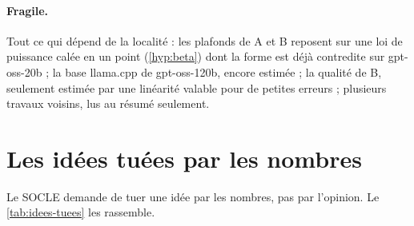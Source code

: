 \paragraph{Fragile.} Tout ce qui dépend de la localité : les plafonds de A et B reposent sur une loi de puissance calée en un point (\cref{hyp:beta}) dont la forme est déjà contredite sur gpt-oss-20b ; la base llama.cpp de gpt-oss-120b, encore estimée ; la qualité de B, seulement estimée par une linéarité valable pour de petites erreurs ; plusieurs travaux voisins, lus au résumé seulement.

\section{Les idées tuées par les nombres}\label{sec:idees-tuees}

Le SOCLE demande de tuer une idée par les nombres, pas par l'opinion. Le \cref{tab:idees-tuees} les rassemble.


